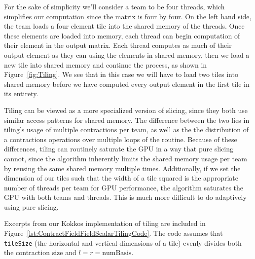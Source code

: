 For the sake of simplicity we'll consider a team to be four threads, which
simplifies our computation since the matrix is four by four. On the left hand
side, the team loads a four element tile into the shared memory of the
threads. Once these elements are loaded into memory, each thread can begin
computation of their element in the output matrix. Each thread computes as much
of their output element as they can using the elements in shared memory, then
we load a new tile into shared memory and continue the process, as shown in Figure~\ref{fig:Tiling}.
We see that in this case we will have to load two tiles into shared memory
before we have computed every output element in the first tile in its entirety. 


    Tiling can be viewed as a more specialized version of slicing, since they
both use similar access patterns for shared memory. The difference between the
two lies in tiling's usage of multiple contractions per team, as well as the
the distribution of a contractions operations over multiple loops of the
routine. Because of these differences, tiling can routinely saturate the GPU in
a way that pure slicing cannot, since the algorithm inherently limits the
shared memory usage per team by reusing the same shared memory multiple times.
Additionally, if we set the dimension of our tiles such that the width of a tile
squared is the appropriate number of threads per team for GPU performance, the algorithm
saturates the GPU with both teams and threads. This is much more difficult to do 
adaptively using pure slicing. 
	
    Excerpts from our Kokkos implementation of tiling are included in Figure~\ref{lst:ContractFieldFieldScalarTilingCode}. The
code assumes that \texttt{tileSize} (the horizontal and vertical dimensions of a tile)
evenly divides both the contraction size and $l = r =
\text{numBasis}$.
	
